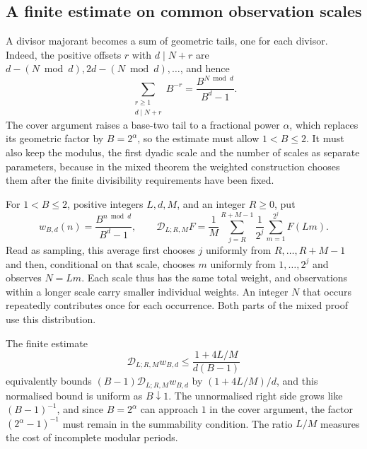 \documentclass[11pt]{article}
\theoremstyle{plain}
\theoremstyle{definition}
\theoremstyle{remark}
\begin{document}
\subsection{A finite estimate on common observation scales}\label{sec:257-common-kernel}
A divisor majorant becomes a sum of geometric tails, one for each
divisor. Indeed, the positive offsets $r$ with $d\mid N+r$ are
$d-(N\bmod d),2d-(N\bmod d),\ldots$, and hence
\[
 \sum_{\substack{r\ge1\\d\mid N+r}}B^{-r}
 =\frac{B^{N\bmod d}}{B^d-1}.
\]
The cover argument raises a base-two tail to a fractional power $\alpha$,
which replaces its geometric factor by $B=2^\alpha$, so the estimate must
allow $1<B\le2$. It must also keep the modulus, the first dyadic scale and
the number of scales as separate parameters, because in the mixed theorem
the weighted construction chooses them after the finite divisibility
requirements have been fixed.

For $1<B\le2$, positive integers $L,d,M$, and an integer $R\ge0$, put
\[
 w_{B,d}(n)=\frac{B^{n\bmod d}}{B^d-1},\qquad
 \mathscr D_{L;R,M}F
 =\frac1M\sum_{j=R}^{R+M-1}\frac1{2^j}
      \sum_{m=1}^{2^j}F(Lm).
\]
Read as sampling, this average first chooses $j$ uniformly from
$R,\ldots,R+M-1$ and then, conditional on that scale, chooses $m$
uniformly from $1,\ldots,2^j$ and observes $N=Lm$. Each scale thus has
the same total weight, and observations within a longer scale carry
smaller individual weights. An integer $N$ that occurs repeatedly
contributes once for each occurrence. Both parts of the mixed proof use
this distribution.

The finite estimate
\begin{equation}
 \mathscr D_{L;R,M}w_{B,d}
 \le\frac{1+4L/M}{d(B-1)}
 \label{eq:257-mixed-finite-kernel}
\end{equation}
equivalently bounds $(B-1)\mathscr D_{L;R,M}w_{B,d}$ by
$(1+4L/M)/d$, and this normalised bound is uniform as $B\downarrow1$.
The unnormalised right side grows like $(B-1)^{-1}$, and since
$B=2^\alpha$ can approach $1$ in the cover argument, the factor
$(2^\alpha-1)^{-1}$ must remain in the summability condition.
The ratio $L/M$ measures the cost of incomplete modular periods.
\end{document}
